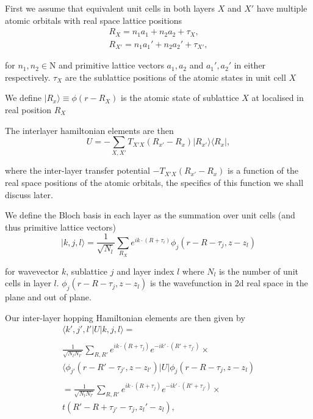 \documentclass[10pt, twocolumn]{article} %
\begin{document}
  First we assume that equivalent unit cells in both layers $X$ and $X'$ have multiple atomic orbitals with real space lattice positions
  \begin{equation}
    \begin{gathered}
    R_X = n_1 a_1 + n_2 a_2 + \tau_X,\\
    R_{X'} = n_1 a_1' + n_2 a_2' + \tau_{X'},
    \end{gathered}
    \label{inter-layer_real_sublattice_positions}
  \end{equation}

  for $n_1, n_2 \in \mathrm{N}$ and primitive lattice vectors $a_1, a_2$ and $a_1', a_2'$ in either respectively. $\tau_X$ are the sublattice positions of the atomic states in unit cell $X$

  We define $| R_x \rangle \equiv \phi(r - R_X)$ is the atomic state of sublattice $X$ at localised in real position $R_X$

  The interlayer hamiltonian elements are then
  \begin{equation}
    U = -\sum_{X, X'} T_{X'X}(R_{x'} - R_x) |R_{x'}\rangle \langle R_x|,
    \label{inter-layer_hamiltonian_elements}
  \end{equation}

  where the inter-layer transfer potential $-T_{X'X}(R_{x'} - R_x)$ is a function of the real space positions of the atomic orbitals, the specifics of this function we shall discuss later.

  We define the Bloch basis in each layer as the summation over unit cells (and thus primitive lattice vectors)
  \begin{equation}
    | k,j,l \rangle = \frac{1}{\sqrt{N_l}}\sum_{R_X}e^{ik\cdot(R+\tau_i)}\phi_j(r-R-\tau_j, z-z_l)
    \label{inter-layer_real_bloch_basis}
  \end{equation}

  for wavevector $k$, sublattice $j$ and layer index $l$ where $N_l$ is the number of unit cells in layer $l$. $\phi_j (r - R - \tau_j, z-z_l)$ is the wavefunction in 2d real space in the plane and out of plane.

  Our inter-layer hopping Hamiltonian elements are then given by
  \begin{multline}
    \langle k',j',l' | U | k, j, l \rangle = \\
    ~\\
    \frac{1}{\sqrt{N_l N_{l'}}} \sum_{R, R'} e^{ik \cdot (R+\tau_j)} e^{-ik' \cdot (R' + \tau_{j'})} \times \\
    \langle \phi_{j'}(r - R' - \tau_{j'}, z - z_{l'}) | U | \phi_j (r - R - \tau_j, z - z_l)\\
    ~\\
     =\frac{1}{\sqrt{N_l N_{l'}}} \sum_{R, R'} e^{ik \cdot (R+\tau_j)} e^{-ik' \cdot (R' + \tau_{j'})} \times \\
     t(R'-R +\tau_{j'} - \tau_j, z_l' - z_l),
    \label{}
  \end{multline}
\end{document}
